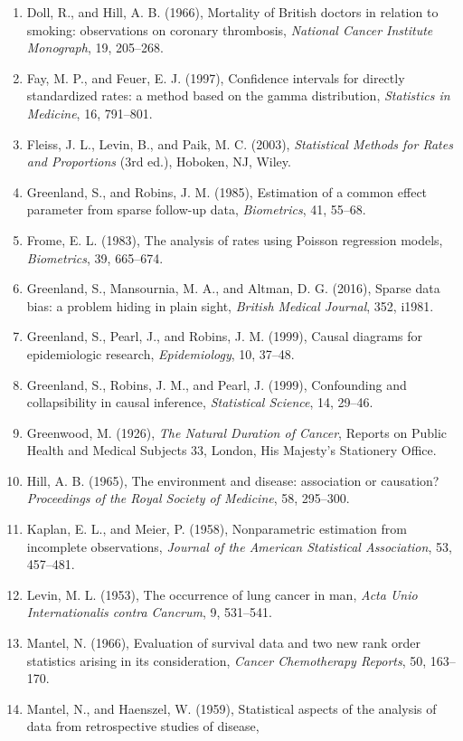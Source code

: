 \documentclass[11pt,a4paper]{article}
\numberwithin{equation}{section}
\theoremstyle{definition}
\begin{document}
\begin{enumerate}
{Diseases}, 8, 699--712.
\item Doll, R., and Hill, A. B. (1966), Mortality of British doctors in relation to smoking: observations on coronary thrombosis,
\emph{National Cancer Institute Monograph}, 19, 205--268.
\item Fay, M. P., and Feuer, E. J. (1997), Confidence intervals for directly standardized rates: a method based on the gamma
distribution, \emph{Statistics in Medicine}, 16, 791--801.
\item Fleiss, J. L., Levin, B., and Paik, M. C. (2003), \emph{Statistical Methods for Rates and Proportions} (3rd ed.), Hoboken, NJ, Wiley.
\item Greenland, S., and Robins, J. M. (1985), Estimation of a common effect parameter from sparse follow-up data, \emph{Biometrics}, 41,
55--68.
\item Frome, E. L. (1983), The analysis of rates using Poisson regression models, \emph{Biometrics}, 39, 665--674.
\item Greenland, S., Mansournia, M. A., and Altman, D. G. (2016), Sparse data bias: a problem hiding in plain sight, \emph{British
Medical Journal}, 352, i1981.
\item Greenland, S., Pearl, J., and Robins, J. M. (1999), Causal diagrams for epidemiologic research, \emph{Epidemiology}, 10, 37--48.
\item Greenland, S., Robins, J. M., and Pearl, J. (1999), Confounding and collapsibility in causal inference, \emph{Statistical Science},
14, 29--46.
\item Greenwood, M. (1926), \emph{The Natural Duration of Cancer}, Reports on Public Health and Medical Subjects 33, London, His Majesty's
Stationery Office.
\item Hill, A. B. (1965), The environment and disease: association or causation? \emph{Proceedings of the Royal Society of Medicine}, 58,
295--300.
\item Kaplan, E. L., and Meier, P. (1958), Nonparametric estimation from incomplete observations, \emph{Journal of the American Statistical
Association}, 53, 457--481.
\item Levin, M. L. (1953), The occurrence of lung cancer in man, \emph{Acta Unio Internationalis contra Cancrum}, 9, 531--541.
\item Mantel, N. (1966), Evaluation of survival data and two new rank order statistics arising in its consideration, \emph{Cancer
Chemotherapy Reports}, 50, 163--170.
\item Mantel, N., and Haenszel, W. (1959), Statistical aspects of the analysis of data from retrospective studies of disease,

\end{enumerate}
\end{document}
